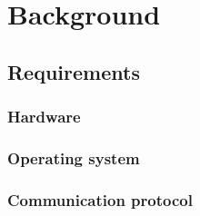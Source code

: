 \section{Background}

%	
\subsection{Requirements}
%	
\subsubsection{Hardware}

\subsubsection{Operating system}

\subsubsection{Communication protocol}

